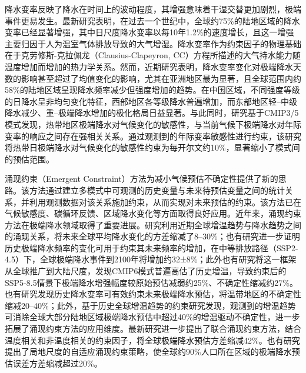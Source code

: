 \documentclass[draft]{agujournal2019}
\begin{document}
降水变率反映了降水在时间上的波动程度，其增强意味着干湿交替更加剧烈，极端事件更易发生。最新研究表明，在过去一个世纪中，全球约75\%的陆地区域的降水变率已经显著增强，其中日尺度降水变率以每10年1.2\%的速度增长，且这一增强主要归因于人为温室气体排放导致的大气增湿\cite{zhang_anthropogenic_2024}。降水变率作为约束因子的物理基础在于克劳修斯-克拉佩龙（Clausius-Clapeyron, CC）方程所描述的大气持水能力随温度增加而增加的热力学关系\cite{vergara-temprado_extreme_2021}。然而，近期研究表明，降水变率变化对极端降水天数的影响甚至超过了均值变化的影响，尤其在亚洲地区最为显著\cite{nordling_climate_2025}，且全球范围内约58\%的陆地区域呈现降水频率减少但强度增加的趋势\cite{feldman_widespread_2026}。在中国区域，不同强度等级的日降水呈非均匀变化特征，西部地区各等级降水普遍增加，而东部地区轻--中级降水减少、重--极端降水增加的极化格局日益显著\cite{wang_non-uniform_2024}。与此同时，研究基于CMIP3/5模式发现，热带地区极端降水对气候变化的敏感性，与当前气候下极端降水对年际变率的响应之间存在强相关关系\cite{ogorman_sensitivity_2012}。通过观测到的年际变率敏感性进行约束，该研究将热带日极端降水对气候变化的敏感性约束为每开尔文约10\%，显著缩小了模式间的预估范围。

涌现约束（Emergent Constraint）方法为减小气候预估不确定性提供了新的思路\cite{hall_progressing_2019}。该方法通过建立多模式中可观测的历史变量与未来待预估变量之间的统计关系，并利用观测数据对该关系施加约束，从而实现对未来预估的约束。该方法已在气候敏感度、碳循环反馈、区域降水变化等方面取得良好应用\cite{hall_progressing_2019}。近年来，涌现约束方法在极端降水领域取得了重要进展。研究利用近期全球增温趋势与降水趋势之间的涌现关系，将未来全球平均降水变化的方差缩减了8--30\%\cite{shiogama_emergent_2022}；也有研究进一步证明历史极端降水频率的变化可用于约束其未来频率的增加，在中等排放路径（SSP2-4.5）下，全球极端降水事件到2100年将增加约32±8\%\cite{thackeray_constraining_2022}；此外也有研究将这一框架从全球推广到大陆尺度，发现CMIP6模式普遍高估了历史增温，导致约束后的SSP5-8.5情景下极端降水增强幅度较原始预估减弱约25\%、不确定性缩减约27\%\cite{paik_emergent_2023}。也有研究发现历史降水变率可有效约束未来极端降水预估，将温带地区的不确定性缩减20--40\%\cite{zhang_constraining_2022}；此外，基于历史全球增温趋势的约束研究发现，观测到的增温趋势可消除全球大部分陆地区域极端降水预估中超过40\%的增温驱动不确定性\cite{li_constraining_2024}，进一步拓展了涌现约束方法的应用维度。最新研究进一步提出了联合涌现约束方法，结合温度相关和非温度相关的约束因子，将全球极端降水预估方差缩减42\%\cite{shiogama_combined_2025}。也有研究提出了局地尺度的自适应涌现约束策略，使全球约90\%人口所在区域的极端降水预估误差方差缩减超过20\%\cite{li_increasing_2025}。
\end{document}
